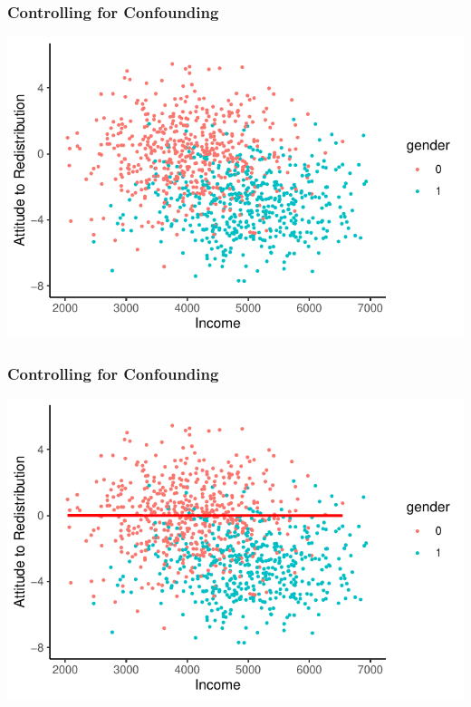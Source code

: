 \documentclass[xcolor=x11names,compress]{beamer}\usepackage[]{graphicx}\usepackage[]{color}
\makeatletter
\def\maxwidth{ %
  \ifdim\Gin@nat@width>\linewidth
    \linewidth
  \else
    \Gin@nat@width
  \fi
}
\newenvironment{knitrout}{}{} %
\renewcommand{\(}{\begin{columns}}
\renewcommand{\)}{\end{columns}}
\newcommand{\<}[1]{\begin{column}{#1}}
\renewcommand{\>}{\end{column}}
\makeatother
\begin{document}
\begin{frame}
\frametitle{Controlling for Confounding}
\begin{knitrout}
\color{fgcolor}
\includegraphics[width=\maxwidth]{figure/confound0b-1} 

\end{knitrout}
\end{frame}

\begin{frame}
\frametitle{Controlling for Confounding}
\begin{knitrout}
\color{fgcolor}
\includegraphics[width=\maxwidth]{figure/confound1a-1} 

\end{knitrout}
\end{frame}
\end{document}
